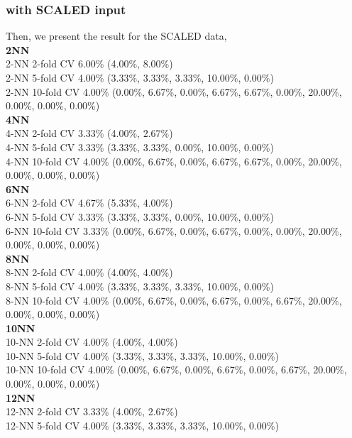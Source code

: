 \documentclass[11pt,a4paper]{article}
\begin{document}
\hypertarget{kResultSCALED}{}
\subsubsection{with SCALED input}
Then, we present the result for the SCALED data, \\
\textbf{2NN }\\
2-NN 2-fold CV   6.00\%   (4.00\%, 8.00\%)\\  
2-NN 5-fold CV   4.00\%   (3.33\%, 3.33\%, 3.33\%, 10.00\%, 0.00\%)\\  
2-NN 10-fold CV   4.00\%   (0.00\%, 6.67\%, 0.00\%, 6.67\%, 6.67\%, 0.00\%, 20.00\%, 0.00\%, 0.00\%, 0.00\%)\\  
\textbf{4NN }\\
4-NN 2-fold CV   3.33\%   (4.00\%, 2.67\%)\\  
4-NN 5-fold CV   3.33\%   (3.33\%, 3.33\%, 0.00\%, 10.00\%, 0.00\%)\\  
4-NN 10-fold CV   4.00\%   (0.00\%, 6.67\%, 0.00\%, 6.67\%, 6.67\%, 0.00\%, 20.00\%, 0.00\%, 0.00\%, 0.00\%)\\  
\textbf{6NN }\\
6-NN 2-fold CV   4.67\%   (5.33\%, 4.00\%)\\  
6-NN 5-fold CV   3.33\%   (3.33\%, 3.33\%, 0.00\%, 10.00\%, 0.00\%)\\  
6-NN 10-fold CV   3.33\%   (0.00\%, 6.67\%, 0.00\%, 6.67\%, 0.00\%, 0.00\%, 20.00\%, 0.00\%, 0.00\%, 0.00\%)\\  
\textbf{8NN }\\
8-NN 2-fold CV   4.00\%   (4.00\%, 4.00\%)\\  
8-NN 5-fold CV   4.00\%   (3.33\%, 3.33\%, 3.33\%, 10.00\%, 0.00\%)\\  
8-NN 10-fold CV   4.00\%   (0.00\%, 6.67\%, 0.00\%, 6.67\%, 0.00\%, 6.67\%, 20.00\%, 0.00\%, 0.00\%, 0.00\%)\\  
\textbf{10NN }\\
10-NN 2-fold CV   4.00\%   (4.00\%, 4.00\%)\\  
10-NN 5-fold CV   4.00\%   (3.33\%, 3.33\%, 3.33\%, 10.00\%, 0.00\%)\\  
10-NN 10-fold CV   4.00\%   (0.00\%, 6.67\%, 0.00\%, 6.67\%, 0.00\%, 6.67\%, 20.00\%, 0.00\%, 0.00\%, 0.00\%)\\  
\textbf{12NN }\\
12-NN 2-fold CV   3.33\%   (4.00\%, 2.67\%)\\  
12-NN 5-fold CV   4.00\%   (3.33\%, 3.33\%, 3.33\%, 10.00\%, 0.00\%)\\  
\end{document}
